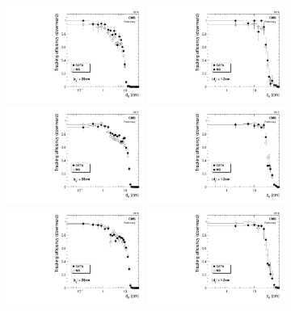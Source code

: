 \begin{figure}[hbtp]
\centering
\includegraphics[width=0.4\textwidth]{figures/tracking_eff/2016/Eff0vsD0.pdf}
\includegraphics[width=0.4\textwidth]{figures/tracking_eff/2016/Eff0vsZ0.pdf}
\\
\includegraphics[width=0.4\textwidth]{figures/tracking_eff/2017/Eff0vsD0.pdf}
\includegraphics[width=0.4\textwidth]{figures/tracking_eff/2017/Eff0vsZ0.pdf}
\\
\includegraphics[width=0.4\textwidth]{figures/tracking_eff/2018/Eff0vsD0.pdf}
\includegraphics[width=0.4\textwidth]{figures/tracking_eff/2018/Eff0vsZ0.pdf}

\end{figure}
